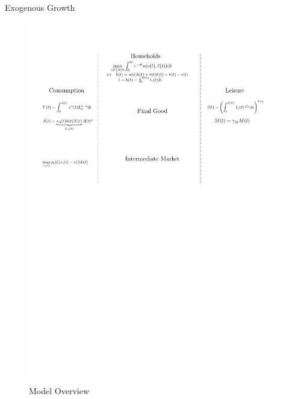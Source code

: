 \documentclass[usenames,dvipsnames]{beamer}
\begin{document}
\begin{frame}{Exogenous Growth}
    \begin{figure}
        \centering
        \includegraphics[width = \textwidth]{Presentation01/Figures/Mod1.pdf}
        \caption{Model Overview}
    \end{figure}
\end{frame}
\end{document}
